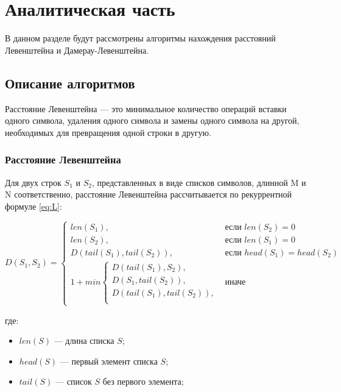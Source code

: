 \chapter{Аналитическая часть}

В данном разделе будут рассмотрены алгоритмы нахождения расстояний Левенштейна и Дамерау-Левенштейна.

\section{Описание алгоритмов}

Расстояние Левенштейна --- это минимальное количество операций вставки одного символа, удаления одного символа и замены одного символа на другой, необходимых для превращения одной строки в другую.

\subsection{Расстояние Левенштейна}
Для двух строк $S_{1}$ и $S_{2}$, представленных в виде списков символов, длинной M и N соответственно, расстояние Левенштейна рассчитывается по рекуррентной формуле \ref{eq:L}:

\begin{equation}
	\label{eq:L}
	D(S_{1}, S_{2}) = \begin{cases}
	len(S_{1}), &\text{если $len(S_{2})=0$}\\
	len(S_{2}), &\text{если $len(S_{1})=0$}\\
	D(tail(S_{1}), tail(S_{2})), &\text{если $head(S_{1})=head(S_{2})$}\\
	1 + min \begin{cases}
		D(tail(S_{1}), S_{2}),\\
		D(S_{1}, tail(S_{2})),\\
		D(tail(S_{1}), tail(S_{2})),\\
	\end{cases}
	&\text{иначе}
	\end{cases}
\end{equation}

\vspace{5mm}

где:
\begin{itemize}
	\item $len(S)$ — длина списка $S$;
	\item $head(S)$ — первый элемент списка $S$;
	\item $tail(S)$ — список $S$ без первого элемента;
\end{itemize}


